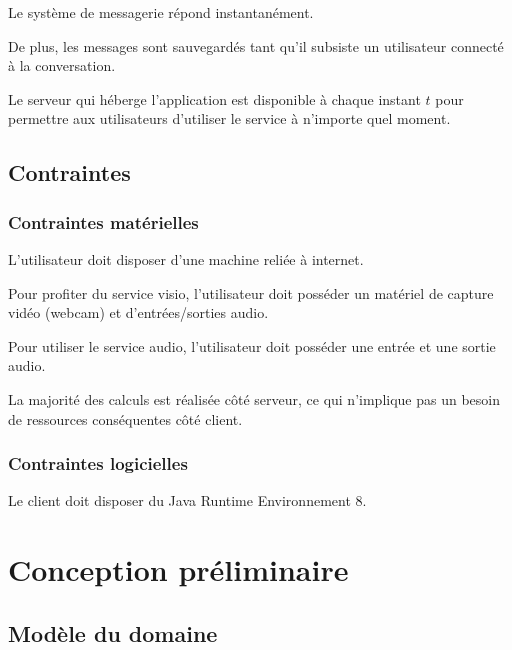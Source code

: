 \documentclass[11pt,dvipsnames,svgnames]{report}
\begin{document}
Le système de messagerie répond instantanément.

De plus, les messages sont sauvegardés tant qu'il subsiste un utilisateur connecté à la conversation.

Le serveur qui héberge l'application est disponible à chaque instant $t$ pour permettre aux utilisateurs d'utiliser le service à n'importe quel moment.

\section{Contraintes}
\subsection{Contraintes matérielles}
L'utilisateur doit disposer d'une machine reliée à internet.

Pour profiter du service visio, l'utilisateur doit posséder un matériel de capture vidéo (webcam) et d'entrées/sorties audio.

Pour utiliser le service audio, l'utilisateur doit posséder une entrée et une sortie audio.

La majorité des calculs est réalisée côté serveur, ce qui n'implique pas un besoin de ressources conséquentes côté client.

\subsection{Contraintes logicielles}

Le client doit disposer du Java Runtime Environnement 8.

\chapter{Conception préliminaire}

\section{Modèle du domaine}
\end{document}
